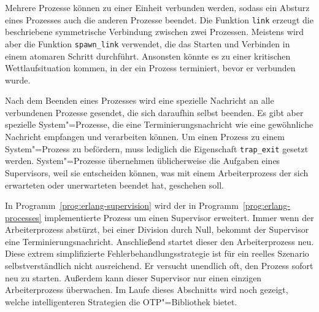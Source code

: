 Mehrere Prozesse können zu einer Einheit verbunden werden, sodass ein Absturz eines Prozesses auch die anderen Prozesse beendet. Die Funktion \lstinline{link} erzeugt die beschriebene symmetrische Verbindung zwischen zwei Prozessen. Meistens wird aber die Funktion \lstinline{spawn_link} verwendet, die das Starten und Verbinden in einem atomaren Schritt durchführt. Ansonsten könnte es zu einer kritischen Wettlaufsituation kommen, in der ein Prozess terminiert, bevor er verbunden wurde.

Nach dem Beenden eines Prozesses wird eine spezielle Nachricht an alle verbundenen Prozesse gesendet, die sich daraufhin selbst beenden. Es gibt aber spezielle System"=Prozesse, die eine Terminierungsnachricht wie eine gewöhnliche Nachricht empfangen und verarbeiten können. Um einen Prozess zu einem System"=Prozess zu befördern, muss lediglich die Eigenschaft \lstinline{trap_exit} gesetzt werden. System"=Prozesse übernehmen üblicherweise die Aufgaben eines Supervisors, weil sie entscheiden können, was mit einem Arbeiterprozess der sich erwarteten oder unerwarteten beendet hat, geschehen soll.

In Programm~\ref{prog:erlang-supervision} wird der in Programm~\ref{prog:erlang-processes} implementierte Prozess um einen Supervisor erweitert. Immer wenn der Arbeiterprozess abstürzt, \zB bei einer Division durch Null, bekommt der Supervisor eine Terminierungsnachricht. Anschließend startet dieser den Arbeiterprozess neu. Diese extrem simplifizierte Fehlerbehandlungsstrategie ist für ein reelles Szenario selbstverständlich nicht ausreichend. Er versucht unendlich oft, den Prozess sofort neu zu starten. Außerdem kann dieser Supervisor nur einen einzigen Arbeiterprozess überwachen. Im Laufe dieses Abschnitts wird noch gezeigt, welche intelligenteren Strategien die OTP"=Bibliothek bietet.

